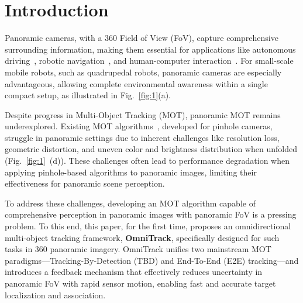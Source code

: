 %

\section{Introduction}
\label{sec:intro}


%

Panoramic cameras, with a 360{\textdegree} Field of View (FoV), capture comprehensive surrounding information, making them essential for applications like autonomous driving~\cite{Wen_2024_CVPR,cao2024occlusion}, robotic navigation~\cite{van2024visual,shi2023panoflow}, and human-computer interaction~\cite{wu2024effect,han2022panoramic_activity}. 
For small-scale mobile robots, such as quadrupedal robots, panoramic cameras are especially advantageous, allowing complete environmental awareness within a single compact setup, as illustrated in Fig.~\ref{fig:1}(a).

%

Despite progress in Multi-Object Tracking (MOT), panoramic MOT remains underexplored. 
Existing MOT algorithms~\cite{Chen_2024_CVPR,lv2024diffmot}, developed for pinhole cameras, struggle in panoramic settings due to inherent challenges like resolution loss, geometric distortion, and uneven color and brightness distribution when unfolded (Fig.~\ref{fig:1}~(d)). 
These challenges often lead to performance degradation when applying pinhole-based algorithms to panoramic images, limiting their effectiveness for panoramic scene perception.
%

To address these challenges, developing an MOT algorithm capable of comprehensive perception in panoramic images with panoramic FoV is a pressing problem. 
To this end, this paper, for the first time, proposes an omnidirectional multi-object tracking framework, \textbf{OmniTrack}, specifically designed for such tasks in 360{\textdegree} panoramic imagery. 
OmniTrack unifies two mainstream MOT paradigms—Tracking-By-Detection (TBD) and End-To-End (E2E) tracking—and introduces a feedback mechanism that effectively reduces uncertainty in panoramic FoV with rapid sensor motion, enabling fast and accurate target localization and association.

